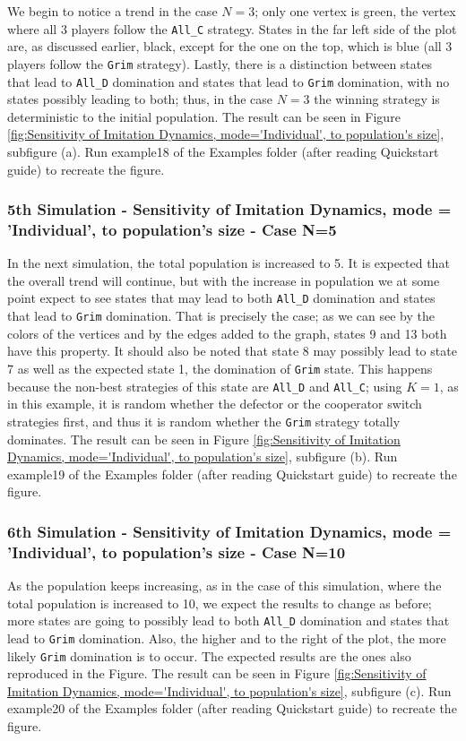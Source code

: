 We begin to notice a trend in the case $N=3$; only one vertex is green, the vertex where all 3 players follow the \texttt{All\_C} strategy. States in the far left side of the plot are, as discussed earlier, black, except for the one on the top, which is blue (all 3 players follow the \texttt{Grim} strategy). Lastly, there is a distinction between states that lead to \texttt{All\_D} domination and states that lead to \texttt{Grim} domination, with no states possibly leading to both; thus, in the case $N=3$ the winning strategy is deterministic to the initial population. The result can be seen in Figure \ref{fig:Sensitivity of Imitation Dynamics, mode='Individual', to population's size}, subfigure (a). Run example18 of the Examples folder (after reading Quickstart guide) to recreate the figure.

\subsubsection{5th Simulation - Sensitivity of Imitation Dynamics, mode = 'Individual', to population's size - Case N=5}
In the next simulation, the total population is increased to 5. It is expected that the overall trend will continue, but with the increase in population we at some point expect to see states that may lead to both \texttt{All\_D} domination and states that lead to \texttt{Grim} domination. That is precisely the case; as we can see by the colors of the vertices and by the edges added to the graph, states 9 and 13 both have this property. It should also be noted that state 8 may possibly lead to state 7 as well as the expected state 1, the domination of \texttt{Grim} state. This happens because the non-best strategies of this state are \texttt{All\_D} and \texttt{All\_C}; using $K=1$, as in this example, it is random whether the defector or the cooperator switch strategies first, and thus it is random whether the \texttt{Grim} strategy totally dominates. The result can be seen in Figure \ref{fig:Sensitivity of Imitation Dynamics, mode='Individual', to population's size}, subfigure (b). Run example19 of the Examples folder (after reading Quickstart guide) to recreate the figure.

\subsubsection{6th Simulation - Sensitivity of Imitation Dynamics, mode = 'Individual', to population's size - Case N=10}
As the population keeps increasing, as in the case of this simulation, where the total population is increased to 10, we expect the results to change as before; more states are going to possibly lead to both \texttt{All\_D} domination and states that lead to \texttt{Grim} domination. Also, the higher and to the right of the plot, the more likely \texttt{Grim} domination is to occur. The expected results are the ones also reproduced in the Figure. The result can be seen in Figure \ref{fig:Sensitivity of Imitation Dynamics, mode='Individual', to population's size}, subfigure (c). Run example20 of the Examples folder (after reading Quickstart guide) to recreate the figure.

